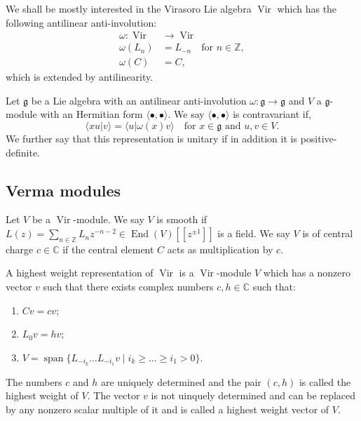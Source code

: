 \documentclass[a4paper, 12pt, reqno]{amsart}
\theoremstyle{remark}
\numberwithin{equation}{subsection}
\DeclareMathOperator{\Vir}{Vir}
\DeclareMathOperator{\End}{End}
\DeclareMathOperator{\vspan}{span}
\begin{document}
We shall be mostly interested in the Virasoro Lie algebra $\Vir$ which has the following antilinear anti-involution:
\begin{align*}
  \omega: \Vir &\to \Vir \\
  \omega(L_n) &= L_{-n} \quad \text{for }n \in \mathbb{Z}, \\
  \omega(C) &= C,
\end{align*}
which is extended by antilinearity.

Let $\mathfrak{g}$ be a Lie algebra with an antilinear anti-involution $\omega: \mathfrak{g} \to \mathfrak{g}$ and $V$ a $\mathfrak{g}$-module with an Hermitian form $\langle \bullet, \bullet \rangle$.
We say $\langle \bullet, \bullet \rangle$ is contravariant if,
\begin{equation*}
  \langle xu| v \rangle = \langle u| \omega(x)v\rangle \quad \text{for }x \in \mathfrak{g}\text{ and }u, v \in V.
\end{equation*}
We further say that this representation is unitary if in addition it is positive-definite.

\subsection{Verma modules}
\label{sec:verma-modules}

Let $V$ be a $\Vir$-module.
We say $V$ is smooth if $L(z) = \sum_{n \in \mathbb{Z}}L_{n}z^{-n - 2} \in \End(V)[[z^{\pm 1}]]$ is a field.
We say $V$ is of central charge $c\in \mathbb{C}$ if the central element $C$ acts as multiplication by $c$.

A highest weight representation of $\Vir$ is a $\Vir$-module $V$ which has a nonzero vector $v$ such that there exists complex numbers $c, h \in \mathbb{C}$ such that:
\begin{enumerate}
  \item $Cv = cv$; 
  \item $L_0v = hv$;
  \item $V = \vspan\{L_{-i_k}\dots L_{-i_1}v \mid i_k \ge \dots \ge i_1 > 0\}$.
\end{enumerate}
The numbers $c$ and $h$ are uniquely determined and the pair $(c, h)$ is called the highest weight of $V$.
The vector $v$ is not uinquely determined and can be replaced by any nonzero scalar multiple of it and is called a highest weight vector of $V$.
\end{document}
